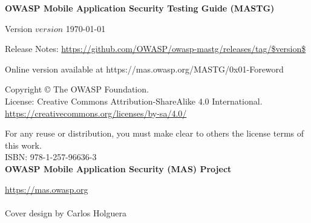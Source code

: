 \thispagestyle{empty} %

\textbf{OWASP Mobile Application Security Testing Guide (MASTG)}

Version $version$ \today

Release Notes: \url{https://github.com/OWASP/owasp-mastg/releases/tag/$version$}

Online version available at https://mas.owasp.org/MASTG/0x01-Foreword

Copyright © The OWASP Foundation. \\

License: Creative Commons Attribution-ShareAlike 4.0 International.
\url{https://creativecommons.org/licenses/by-sa/4.0/}

For any reuse or distribution, you must make clear to others the license terms of this work.\\

ISBN: 978-1-257-96636-3 \\

\textbf{OWASP Mobile Application Security (MAS) Project}

\url{https://mas.owasp.org} \\ \\

Cover design by Carlos Holguera
